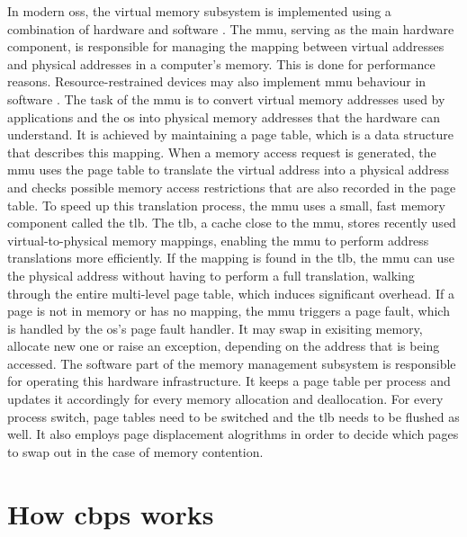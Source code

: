 In modern \acp{os}, the virtual memory subsystem is implemented using a combination of hardware and software \cite{mos2009}.
The \ac{mmu}, serving as the main hardware component, is responsible for managing the mapping between virtual addresses and physical addresses in a computer's memory.
This is done for performance reasons.
Resource-restrained devices may also implement \ac{mmu} behaviour in software \cite{sw-mmu2005}.
The task of the \ac{mmu} is to convert virtual memory addresses used by applications and the \ac{os} into physical memory addresses that the hardware can understand.
It is achieved by maintaining a page table, which is a data structure that describes this mapping.
When a memory access request is generated, the \ac{mmu} uses the page table to translate the virtual address into a physical address and checks possible memory access restrictions that are also recorded in the page table.
To speed up this translation process, the \ac{mmu} uses a small, fast memory component called the \ac{tlb}.
The \ac{tlb}, a cache close to the \ac{mmu}, stores recently used virtual-to-physical memory mappings, enabling the \ac{mmu} to perform address translations more efficiently.
If the mapping is found in the \ac{tlb}, the \ac{mmu} can use the physical address without having to perform a full translation, walking through the entire multi-level page table, which induces significant overhead.
If a page is not in memory or has no mapping, the \ac{mmu} triggers a page fault, which is handled by the \ac{os}'s page fault handler.
It may swap in exisiting memory, allocate new one or raise an exception, depending on the address that is being accessed.
The software part of the memory management subsystem is responsible for operating this hardware infrastructure.
It keeps a page table per process and updates it accordingly for every memory allocation and deallocation.
For every process switch, page tables need to be switched and the \ac{tlb} needs to be flushed as well.
It also employs page displacement alogrithms in order to decide which pages to swap out in the case of memory contention.

\section{How \acs{cbps} works}
\label{sec:how-cbps-works}


